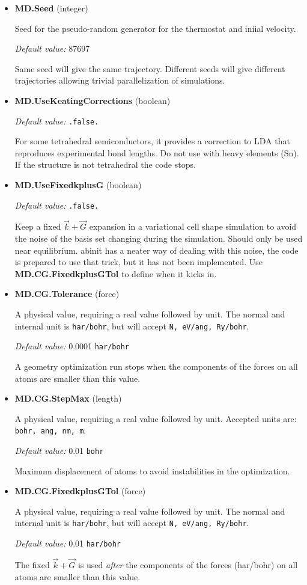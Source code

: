 \documentclass[11pt]{article}
\begin{document}
\begin{itemize}
   \item{\bf MD.Seed} (integer)

   Seed for the pseudo-random generator for the thermostat and iniial velocity.

   \textit{Default value:} 87697

   Same seed will give the same trajectory.  Different seeds will give
   different trajectories allowing trivial parallelization of simulations.

   \item{\bf MD.UseKeatingCorrections} (boolean)

   \textit{Default value:}  \texttt{.false.}

   For some tetrahedral semiconductors, it provides a correction to LDA
   that reproduces experimental bond lengths.  Do not use with heavy elements (Sn).
   If the structure is not tetrahedral the code stops.

   \item{\bf MD.UseFixedkplusG} (boolean)

  \textit{Default value:} \texttt{.false.}

   Keep a fixed $\vec k + \vec G$ expansion in a variational cell shape
   simulation to avoid the noise of the basis set changing during the simulation.
   Should only be used near equilibrium.  abinit has a neater way of dealing with this noise,
   the code is prepared to use that trick, but it has not been implemented.
   Use {\bf MD.CG.FixedkplusGTol} to define when it kicks in.

   \item{\bf MD.CG.Tolerance} (force)

   A physical value, requiring a real value followed by unit.
   The normal and internal unit is \texttt{har/bohr},
   but will accept \texttt{N, eV/ang, Ry/bohr}.

  \textit{Default value:}  0.0001 \texttt{har/bohr}

   A geometry optimization run stops when the components of the forces on all atoms are smaller
   than this value.

   \item{\bf MD.CG.StepMax} (length)

   A physical value, requiring a real value followed by unit.
   Accepted units are: \texttt{bohr, ang, nm, m}.

  \textit{Default value:}  0.01 \texttt{bohr}

   Maximum displacement of atoms to avoid instabilities in the optimization.

   \item{\bf MD.CG.FixedkplusGTol} (force)

   A physical value, requiring a real value followed by unit.
   The normal and internal unit is \texttt{har/bohr},
   but will accept \texttt{N, eV/ang, Ry/bohr}.

  \textit{Default value:}  0.01 \texttt{har/bohr}

   The fixed $\vec k + \vec G$ is used {\it after} the components of the forces (har/bohr)
   on all atoms are smaller than this value.

\end{itemize}
\end{document}
